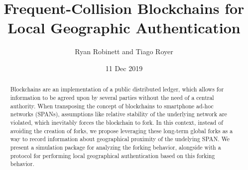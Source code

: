 \documentclass[twocolumn,10pt]{article}
\begin{document}
\title{Frequent-Collision Blockchains for Local Geographic Authentication}
\author{Ryan Robinett and Tiago Royer}
\date{11 Dec 2019}
\maketitle

\begin{abstract}
	Blockchains are an implementation of a public distributed ledger,
	which allows for information to be agreed upon by several parties
	without the need of a central authority.
	When transposing the concept of blockchains to smartphone ad-hoc networks (SPANs),
	assumptions like relative stability of the underlying network are violated,
	which inevitably forces the blockchain to fork.
	In this context,
	instead of avoiding the creation of forks,
	we propose leveraging these long-term global forks
	as a way to record information about geographical proximity of the undelying SPAN.
	We present a simulation package for analyzing the forking behavior,
	alongside with a protocol for performing local geographical authentication
	based on this forking behavior.
\end{abstract}



















\end{document}
